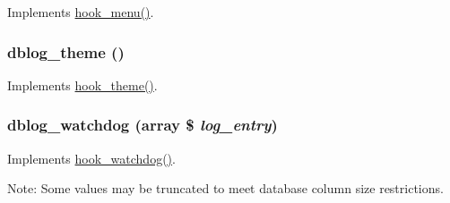 \label{dblog_8module_ac599cb2337e45bf5268f593e84039684}
Implements \hyperlink{group__hooks_ga5c95244fea59b25666e409759e133ded}{hook\_\-menu()}. \hypertarget{dblog_8module_ab4d2846fc313033d586436ed508939f5}{
\subsubsection[{dblog\_\-theme}]{\setlength{\rightskip}{0pt plus 5cm}dblog\_\-theme ()}}
\label{dblog_8module_ab4d2846fc313033d586436ed508939f5}
Implements \hyperlink{group__hooks_ga013ccb45c7aaab1c16cf9691428c910d}{hook\_\-theme()}. \hypertarget{dblog_8module_a955d567c291007c363af583187581e96}{
\subsubsection[{dblog\_\-watchdog}]{\setlength{\rightskip}{0pt plus 5cm}dblog\_\-watchdog (array \$ {\em log\_\-entry})}}
\label{dblog_8module_a955d567c291007c363af583187581e96}
Implements \hyperlink{group__hooks_gab2b8bf0289fad4b39485e933012f290c}{hook\_\-watchdog()}.

Note: Some values may be truncated to meet database column size restrictions. 